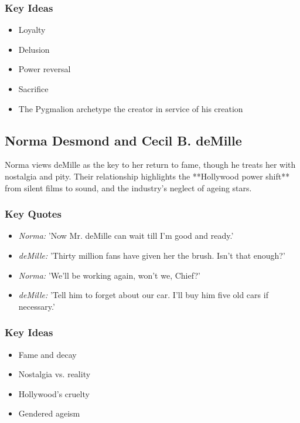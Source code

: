 \documentclass[a4paper]{article}
\begin{document}
\subsubsection*{Key Ideas}
\begin{itemize}
    \item Loyalty
    \item Delusion
    \item Power reversal
    \item Sacrifice
    \item The Pygmalion archetype \textemdash{} the creator in service of his creation
\end{itemize}

\subsection{Norma Desmond and Cecil B. deMille}
Norma views deMille as the key to her return to fame, though he treats her with nostalgia and pity. Their relationship highlights the **Hollywood power shift** from silent films to sound, and the industry's neglect of ageing stars.

\subsubsection*{Key Quotes}
\begin{itemize}
    \item \textit{Norma:} 'Now Mr. deMille can wait till I'm good and ready.'
    \item \textit{deMille:} 'Thirty million fans have given her the brush. Isn’t that enough?'
    \item \textit{Norma:} 'We’ll be working again, won’t we, Chief?'
    \item \textit{deMille:} 'Tell him to forget about our car. I’ll buy him five old cars if necessary.'
\end{itemize}

\subsubsection*{Key Ideas}
\begin{itemize}
    \item Fame and decay
    \item Nostalgia vs. reality
    \item Hollywood’s cruelty
    \item Gendered ageism
\end{itemize}
\end{document}

